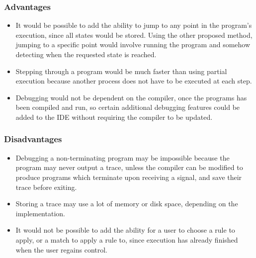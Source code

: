 \documentclass[authoryearcitations]{UoYCSproject}
\begin{document}

\subsubsection{Advantages}
\label{sec:ProposedDesign2Advantages}

\begin{itemize}
    \item It would be possible to add the ability to jump to any point in the
          program's execution, since all states would be stored. Using the other
          proposed method, jumping to a specific point would involve running the
          program and somehow detecting when the requested state is reached.

    \item Stepping through a program would be much faster than using partial
          execution because another process does not have to be executed at each
          step.

    \item Debugging would not be dependent on the compiler, once the programs has
          been compiled and run, so certain additional debugging features could
          be added to the IDE without requiring the compiler to be updated. 
\end{itemize}


\subsubsection{Disadvantages}
\label{sec:ProposedDesign2Disadvantages}

\begin{itemize}
    \item Debugging a non-terminating program may be impossible because the
          program may never output a trace, unless the compiler can be modified
          to produce programs which terminate upon receiving a signal, and save
          their trace before exiting.

    \item Storing a trace may use a lot of memory or disk space, depending on
          the implementation.

    \item It would not be possible to add the ability for a user to choose a
          rule to apply, or a match to apply a rule to, since execution has
          already finished when the user regains control.
\end{itemize}
\end{document}
